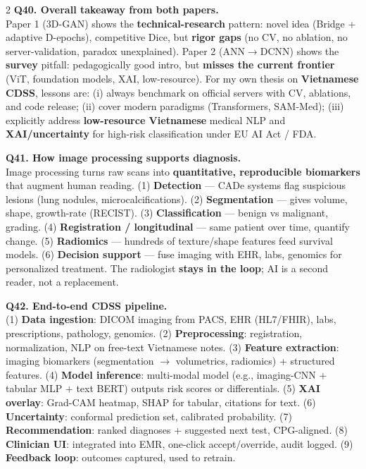 \begin{paracol}{2}
\textbf{Q40. Overall takeaway from both papers.}\\
Paper 1 (3D-GAN) shows the \textbf{technical-research} pattern: novel idea (Bridge + adaptive D-epochs), competitive Dice, but \textbf{rigor gaps} (no CV, no ablation, no server-validation, paradox unexplained). Paper 2 (ANN$\to$DCNN) shows the \textbf{survey} pitfall: pedagogically good intro, but \textbf{misses the current frontier} (ViT, foundation models, XAI, low-resource). For my own thesis on \textbf{Vietnamese CDSS}, lessons are: (i) always benchmark on official servers with CV, ablations, and code release; (ii) cover modern paradigms (Transformers, SAM-Med); (iii) explicitly address \textbf{low-resource Vietnamese} medical NLP and \textbf{XAI/uncertainty} for high-risk classification under EU AI Act / FDA.

\textbf{Q41. How image processing supports diagnosis.}\\
Image processing turns raw scans into \textbf{quantitative, reproducible biomarkers} that augment human reading. (1) \textbf{Detection} — CADe systems flag suspicious lesions (lung nodules, microcalcifications). (2) \textbf{Segmentation} — gives volume, shape, growth-rate (RECIST). (3) \textbf{Classification} — benign vs malignant, grading. (4) \textbf{Registration / longitudinal} — same patient over time, quantify change. (5) \textbf{Radiomics} — hundreds of texture/shape features feed survival models. (6) \textbf{Decision support} — fuse imaging with EHR, labs, genomics for personalized treatment. The radiologist \textbf{stays in the loop}; AI is a second reader, not a replacement.

\textbf{Q42. End-to-end CDSS pipeline.}\\
(1) \textbf{Data ingestion}: DICOM imaging from PACS, EHR (HL7/FHIR), labs, prescriptions, pathology, genomics. (2) \textbf{Preprocessing}: registration, normalization, NLP on free-text Vietnamese notes. (3) \textbf{Feature extraction}: imaging biomarkers (segmentation $\to$ volumetrics, radiomics) + structured features. (4) \textbf{Model inference}: multi-modal model (e.g., imaging-CNN $+$ tabular MLP $+$ text BERT) outputs risk scores or differentials. (5) \textbf{XAI overlay}: Grad-CAM heatmap, SHAP for tabular, citations for text. (6) \textbf{Uncertainty}: conformal prediction set, calibrated probability. (7) \textbf{Recommendation}: ranked diagnoses + suggested next test, CPG-aligned. (8) \textbf{Clinician UI}: integrated into EMR, one-click accept/override, audit logged. (9) \textbf{Feedback loop}: outcomes captured, used to retrain.


\end{paracol}
